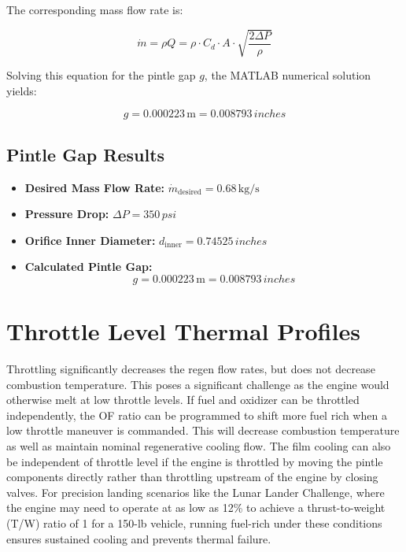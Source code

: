The corresponding mass flow rate is:

\[
\dot{m} = \rho Q = \rho \cdot C_d \cdot A \cdot \sqrt{\frac{2 \Delta P}{\rho}}
\]

Solving this equation for the pintle gap \( g \), the MATLAB numerical solution yields:

\[
g = 0.000223 \, \si{\meter} = 0.008793 \, \si{inches}
\]



\subsection{Pintle Gap Results}

\begin{itemize}
    \item \textbf{Desired Mass Flow Rate:} \(\dot{m}_{\text{desired}} = 0.68 \, \si{\kilo\gram\per\second}\)
    \item \textbf{Pressure Drop:} \(\Delta P = 350 \, \si{psi}\)
    \item \textbf{Orifice Inner Diameter:} \(d_{\text{inner}} = 0.74525 \, \si{inches}\)
    \item \textbf{Calculated Pintle Gap:} 
    \[
    g = 0.000223 \, \si{\meter} = 0.008793 \, \si{inches}
    \]
\end{itemize}



\section{Throttle Level Thermal Profiles}

Throttling significantly decreases the regen flow rates, but does not decrease combustion temperature. This poses a significant challenge as the engine would otherwise melt at low throttle levels. If fuel and oxidizer can be throttled independently, the OF ratio can be programmed to shift more fuel rich when a low throttle maneuver is commanded. This will decrease combustion temperature as well as maintain nominal regenerative cooling flow. The film cooling can also be independent of throttle level if the engine is throttled by moving the pintle components directly rather than throttling upstream of the engine by closing valves. For precision landing scenarios like the Lunar Lander Challenge, where the engine may need to operate at as low as 12\% to achieve a thrust-to-weight (T/W) ratio of 1 for a 150-lb vehicle, running fuel-rich under these conditions ensures sustained cooling and prevents thermal failure.

